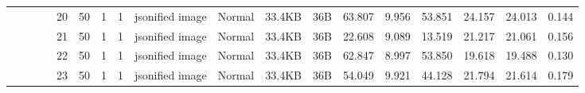 \begin{landscape}
\begin{table}[]
{\begin{tabular}{@{}ccccllllllllllllll@{}}
                                                                                   &                              &                                &                                                                                                          & 20                                                    & 50                                       & 1                                          & 1                                 & jsonified image                  & Normal                             & 33.4KB                                        & 36B                                             & 63.807                  & 9.956    & 53.851                       & 24.157                  & 24.013   & 0.144                        \\
                                                                                   &                              &                                &                                                                                                          & 21                                                    & 50                                       & 1                                          & 1                                 & jsonified image                  & Normal                             & 33.4KB                                        & 36B                                             & 22.608                  & 9.089    & 13.519                       & 21.217                  & 21.061   & 0.156                        \\
                                                                                   &                              &                                &                                                                                                          & 22                                                    & 50                                       & 1                                          & 1                                 & jsonified image                  & Normal                             & 33.4KB                                        & 36B                                             & 62.847                  & 8.997    & 53.850                       & 19.618                  & 19.488   & 0.130                        \\
                                                                                   &                              &                                &                                                                                                          & 23                                                    & 50                                       & 1                                          & 1                                 & jsonified image                  & Normal                             & 33.4KB                                        & 36B                                             & 54.049                  & 9.921    & 44.128                       & 21.794                  & 21.614   & 0.179                        \\

\end{tabular}}
\end{table}
\end{landscape}
